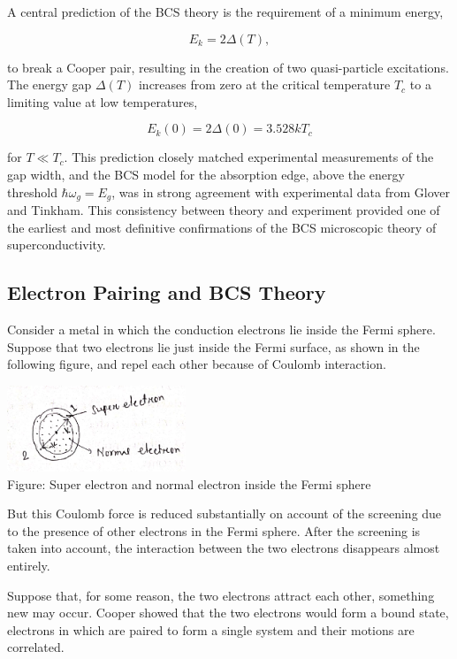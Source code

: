 \documentclass{article}
\begin{document}
A central prediction of the BCS theory is the requirement of a minimum energy,

\[
E_k = 2\Delta(T),
\]

to break a Cooper pair, resulting in the creation of two quasi-particle excitations. The energy gap $\Delta(T)$ increases from zero at the critical temperature $T_c$ to a limiting value at low temperatures,

\[
E_k(0) = 2\Delta(0) = 3.528 k T_c \tag{1}
\]

for $T \ll T_c$. This prediction closely matched experimental measurements of the gap width, and the BCS model for the absorption edge, above the energy threshold $\hbar \omega_g = E_g$, was in strong agreement with experimental data from Glover and Tinkham. This consistency between theory and experiment provided one of the earliest and most definitive confirmations of the BCS microscopic theory of superconductivity.

\subsection{Electron Pairing and BCS Theory}

Consider a metal in which the conduction electrons lie inside the Fermi sphere. Suppose that two electrons lie just inside the Fermi surface, as shown in the following figure, and repel each other because of Coulomb interaction.

\begin{center}
    \includegraphics[width=0.4\textwidth]{figures/fermi_sphere.png} \\
    Figure: Super electron and normal electron inside the Fermi sphere
\end{center}

But this Coulomb force is reduced substantially on account of the screening due to the presence of other electrons in the Fermi sphere. After the screening is taken into account, the interaction between the two electrons disappears almost entirely.

Suppose that, for some reason, the two electrons attract each other, something new may occur. Cooper showed that the two electrons would form a bound state, electrons in which are paired to form a single system and their motions are correlated.
\end{document}
